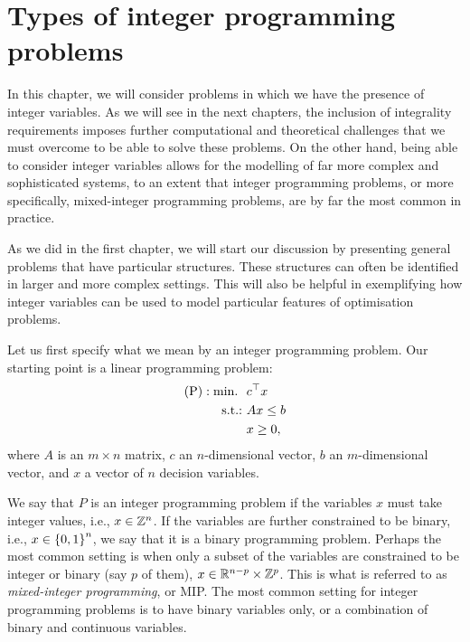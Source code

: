 \section{Types of integer programming problems}

In this chapter, we will consider problems in which we have the presence of integer variables. As we will see in the next chapters, the inclusion of integrality requirements imposes further computational and theoretical challenges that we must overcome to be able to solve these problems. On the other hand, being able to consider integer variables allows for the modelling of far more complex and sophisticated systems, to an extent that integer programming problems, or more specifically, mixed-integer programming problems, are by far the most common in practice.

As we did in the first chapter, we will start our discussion by presenting general problems that have particular structures. These structures can often be identified in larger and more complex settings. This will also be helpful in exemplifying how integer variables can be used to model particular features of optimisation problems.

Let us first specify what we mean by an integer programming problem. Our starting point is a linear programming problem:
  \begin{align*}
	  \text{(P)} : \mathop{\text{min.~}} \ &c^\top x \\
	  \mathop{\text{s.t.:~}} & Ax \leq b \\
	  & x \geq 0,
  \end{align*}
  where $A$ is an $m \times n$ matrix, $c$ an $n$-dimensional vector, $b$ an $m$-dimensional vector, and $x$ a vector of $n$ decision variables. 
  
  We say that $P$ is an integer programming problem if the variables $x$ must take integer values, i.e., $x \in \mathbb{Z}^n$. If the variables are further constrained to be binary, i.e., $x \in \left\{ 0,1 \right \}^n$, we say that it is a binary programming problem. Perhaps the most common setting is when only a subset of the variables are constrained to be integer or binary (say $p$ of them), $x \in \mathbb{R}^{n-p} \times \mathbb{Z}^p$. This is what is referred to as \emph{mixed-integer programming}, or MIP. The most common setting for integer programming problems is to have binary variables only, or a combination of binary and continuous variables. 
   

